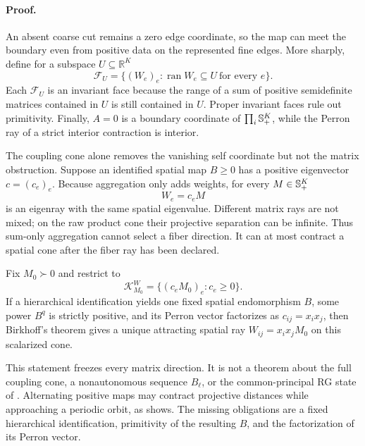 \paragraph{Proof.}
An absent coarse cut remains a zero edge coordinate, so the map can meet the
boundary even from positive data on the represented fine edges.  More
sharply, define for a subspace \(U\subseteq\mathbb R^K\)
\begin{equation}
\mathcal F_U
=\{(W_e)_e:\operatorname{ran}W_e\subseteq U\ \text{for every }e\}.
\label{eq:grg-common-range-face}
\end{equation}
Each \(\mathcal F_U\) is an invariant face because the range of a sum of
positive semidefinite matrices contained in \(U\) is still contained in
\(U\).  Proper invariant faces rule out primitivity.  Finally, \(A=0\) is a
boundary coordinate of \(\prod_i\mathbb S_{+}^K\), while the Perron ray of a strict
interior contraction is interior.

The coupling cone alone removes the vanishing self coordinate but not the
matrix obstruction.  Suppose an identified spatial map \(B\geq0\) has a
positive eigenvector \(c=(c_e)_e\).  Because aggregation only adds weights,
for every \(M\in\mathbb S_{+}^K\)
\begin{equation}
W_e=c_eM
\label{eq:grg-inert-fiber}
\end{equation}
is an eigenray with the same spatial eigenvalue.  Different matrix rays are
not mixed; on the raw product cone their projective separation can be
infinite.  Thus sum-only aggregation cannot select a fiber direction.  It
can at most contract a spatial cone after the fiber ray has been declared.

Fix \(M_0\succ0\) and restrict to
\begin{equation}
\mathcal K^W_{M_0}
=\{(c_eM_0)_e:c_e\geq0\}.
\label{eq:grg-scalarized-cone}
\end{equation}
If a hierarchical identification yields one fixed spatial endomorphism
\(B\), some power \(B^q\) is strictly positive, and its Perron vector
factorizes as \(c_{ij}=x_ix_j\), then Birkhoff's theorem gives a unique
attracting spatial ray \(W_{ij}=x_ix_jM_0\) on this scalarized cone.

This statement freezes every matrix direction.  It is not a theorem about
the full coupling cone, a nonautonomous sequence \(B_\ell\), or the
common-principal RG state of . Alternating positive
maps may contract projective distances while approaching a periodic orbit,
as  shows.  The missing obligations are a fixed
hierarchical identification, primitivity of the resulting \(B\), and the
factorization of its Perron vector.

